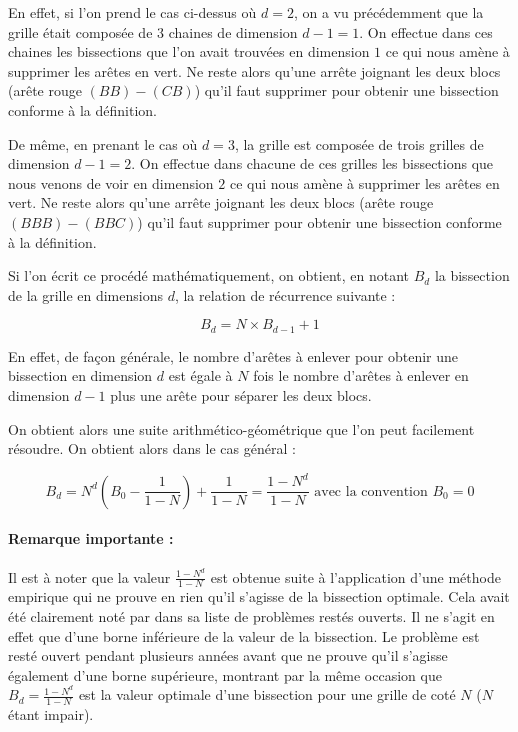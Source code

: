 En effet, si l'on prend le cas ci-dessus où $d=2$, on a vu précédemment que la grille était composée de $3$ chaines de dimension $d-1 = 1$. On effectue dans ces chaines les bissections que l'on avait trouvées en dimension $1$ ce qui nous amène à supprimer les arêtes en vert. Ne reste alors qu'une arrête joignant les deux blocs (arête rouge $(BB)-(CB)$) qu'il faut supprimer pour obtenir une bissection conforme à la définition.

De même, en prenant le cas où $d=3$, la grille est composée de trois grilles de dimension $d-1=2$. On effectue dans chacune de ces grilles les bissections que nous venons de voir en dimension $2$ ce qui nous amène à supprimer les arêtes en vert. Ne reste alors qu'une arrête joignant les deux blocs (arête rouge $(BBB)-(BBC)$) qu'il faut supprimer pour obtenir une bissection conforme à la définition.

Si l'on écrit ce procédé mathématiquement, on obtient, en notant $B_d$ la bissection de la grille en dimensions $d$, la relation de récurrence suivante :

$$B_d = N \times B_{d-1} + 1$$

En effet, de façon générale, le nombre d'arêtes à enlever pour obtenir une bissection en dimension $d$ est égale à $N$ fois le nombre d'arêtes à enlever en dimension $d-1$ plus une arête pour séparer les deux blocs.

On obtient alors une suite arithmético-géométrique que l'on peut facilement résoudre. On obtient alors dans le cas général :

$$B_d = N^d(B_0-\frac{1}{1-N}) + \frac{1}{1-N} = \frac{1-N^d}{1-N} \text{ avec la convention }B_0 = 0$$

\paragraph{Remarque importante :} Il est à noter que la valeur $\frac{1-N^d}{1-N}$ est obtenue suite à l'application d'une méthode empirique qui ne prouve en rien qu'il s'agisse de la bissection optimale. Cela avait été clairement noté par \cite{Leighton1992} dans sa liste de problèmes restés ouverts. Il ne s'agit en effet que d'une borne inférieure de la valeur de la bissection. Le problème est resté ouvert pendant plusieurs années avant que \cite{KE2007} ne prouve qu'il s'agisse également d'une borne supérieure, montrant par la même occasion que $B_d = \frac{1-N^d}{1-N}$ est la valeur optimale d'une bissection pour une grille de coté $N$ ($N$ étant impair).

